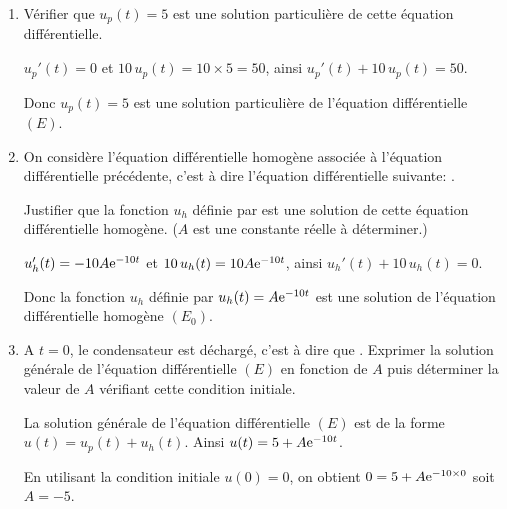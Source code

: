 \begin{enumerate}[series=monDS, resume]
    \item Vérifier que $u_p(t)=5$ est une solution particulière de cette équation différentielle.
    
    \begin{blocvisiblex}[height=2]
    {\quad}
    $u_p'(t)=0$ et $10\, u_p(t)=10 \times 5=50$, ainsi $u_p'(t)+10\, u_p(t)=50$.
    
        Donc $u_p(t)=5$ est une solution particulière de l'équation différentielle $(E)$.
\end{blocvisiblex}
    
    \medskip

    \item On considère l'équation différentielle homogène associée à l'équation différentielle précédente, c'est à dire l'équation différentielle suivante: . \par
    Justifier que la fonction $u_h$ définie par  est une solution de cette équation différentielle homogène. ($A$ est une constante réelle à déterminer.)
    
    \begin{blocvisiblex}[height=3]
    {\quad}
    $u_h'(t)=-10A \mathrm{e}^{-10t}$ et $10\, u_h(t)=10A \mathrm{e}^{-10t}$, ainsi $u_h'(t)+10\, u_h(t)=0$.
    
        Donc la fonction $u_h$ définie par $u_h(t)=A \mathrm{e}^{-10t}$ est une solution de l'équation différentielle homogène $(E_0)$.
    \end{blocvisiblex}

    \medskip

    \item A $t=0$, le condensateur est déchargé, c'est à dire que . Exprimer la solution générale de l'équation différentielle $(E)$ en fonction de $A$ puis déterminer la valeur de $A$ vérifiant cette condition initiale.
    
    \begin{blocvisiblex}[height=2]
    {\quad}

    La solution générale de l'équation différentielle $(E)$ est de la forme $u(t)=u_p(t)+u_h(t)$. Ainsi $u(t)=5 + A \mathrm{e}^{-10t}$.

    En utilisant la condition initiale $u(0)=0$, on obtient $0=5 + A \mathrm{e}^{-10 \times 0}$ soit $A=-5$.
\end{blocvisiblex}
    \end{enumerate}


